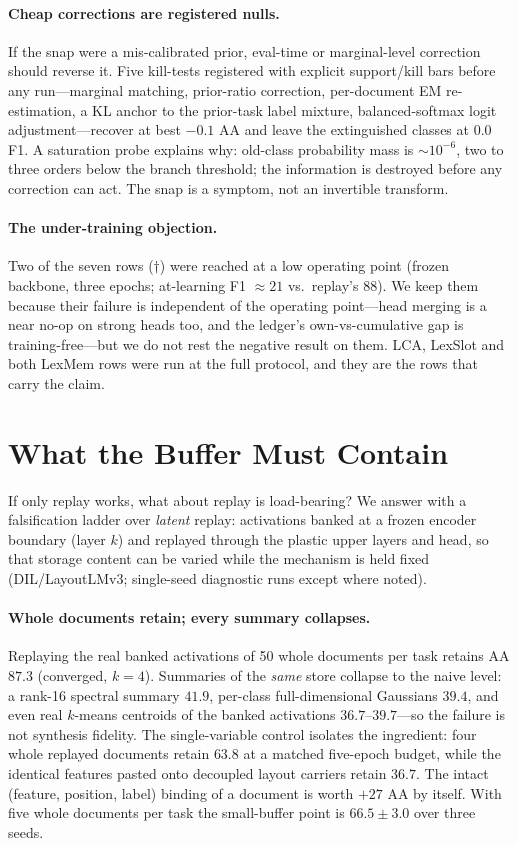 \documentclass{article}
\begin{document}
\paragraph{Cheap corrections are registered nulls.} If the snap were a mis-calibrated prior, eval-time or marginal-level correction should reverse it. Five kill-tests registered with explicit support/kill bars before any run---marginal matching, prior-ratio correction, per-document EM re-estimation, a KL anchor to the prior-task label mixture, balanced-softmax logit adjustment---recover at best $-0.1$ AA and leave the extinguished classes at $0.0$ F1. A saturation probe explains why: old-class probability mass is $\sim10^{-6}$, two to three orders below the branch threshold; the information is destroyed before any correction can act. The snap is a symptom, not an invertible transform.

\paragraph{The under-training objection.} Two of the seven rows ($\dagger$) were reached at a low operating point (frozen backbone, three epochs; at-learning F1 $\approx21$ vs.\ replay's $88$). We keep them because their failure is independent of the operating point---head merging is a near no-op on strong heads too, and the ledger's own-vs-cumulative gap is training-free---but we do not rest the negative result on them. LCA, LexSlot and both LexMem rows were run at the full protocol, and they are the rows that carry the claim.

\section{What the Buffer Must Contain}
\label{sec:buffer}
If only replay works, what about replay is load-bearing? We answer with a falsification ladder over \emph{latent} replay: activations banked at a frozen encoder boundary (layer $k$) and replayed through the plastic upper layers and head, so that storage content can be varied while the mechanism is held fixed (DIL/LayoutLMv3; single-seed diagnostic runs except where noted).

\paragraph{Whole documents retain; every summary collapses.} Replaying the real banked activations of 50 whole documents per task retains AA $87.3$ (converged, $k{=}4$). Summaries of the \emph{same} store collapse to the naive level: a rank-16 spectral summary $41.9$, per-class full-dimensional Gaussians $39.4$, and even real $k$-means centroids of the banked activations $36.7$--$39.7$---so the failure is not synthesis fidelity. The single-variable control isolates the ingredient: four whole replayed documents retain $63.8$ at a matched five-epoch budget, while the identical features pasted onto decoupled layout carriers retain $36.7$. The intact (feature, position, label) binding of a document is worth $+27$ AA by itself. With five whole documents per task the small-buffer point is $66.5\pm3.0$ over three seeds.
\end{document}
